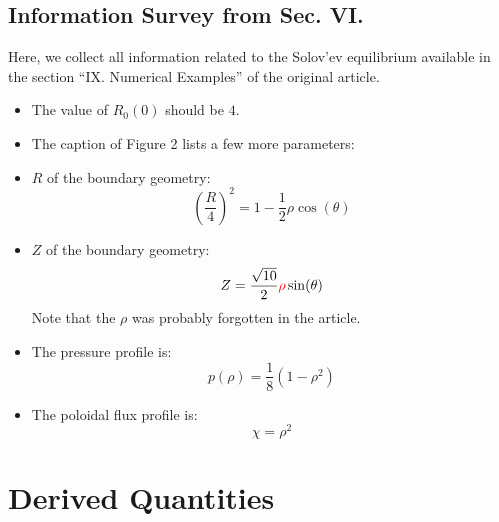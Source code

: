 \subsection{Information Survey from Sec. VI.}
Here, we collect all information
related to the Solov'ev equilibrium
available in the section ``IX. Numerical Examples''
of the original article.

\begin{itemize}

\item
The value of $R_0(0)$ should be $4$.

\item
The caption of Figure 2 lists
a few more parameters:

\item
$R$ of the boundary geometry:
\begin{equation}
 \left(\frac{R}{4}\right)^2 = 1 - \frac{1}{2} \rho \cos(\theta)
\end{equation}

\item
$Z$ of the boundary geometry:
\begin{equation}
 Z = \frac{\sqrt{10}}{2} {\color{red} \rho} \sin(\theta)
\end{equation}
Note that the $\rho$ was probably forgotten in the article.

\item
The pressure profile is:
\begin{equation}
 p(\rho) = \frac{1}{8} (1 - \rho^2)
\end{equation}

\item
The poloidal flux profile is:
\begin{equation}
 \chi = \rho^2
\end{equation}

\end{itemize}

\section{Derived Quantities}

